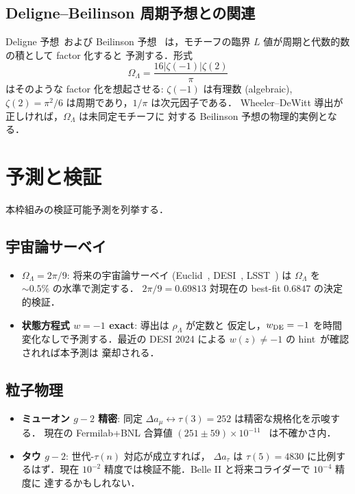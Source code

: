 \documentclass[11pt,a4paper]{article}
\begin{document}
\subsection{Deligne--Beilinson 周期予想との関連}

Deligne 予想~\cite{Deligne1979}および Beilinson 予想~\cite{Beilinson1984}
は，モチーフの臨界 $L$ 値が周期と代数的数の積として factor 化すると
予測する．形式
\begin{equation}
\Omega_\Lambda = \frac{16|\zeta(-1)|\zeta(2)}{\pi}
\end{equation}
はそのような factor 化を想起させる: $\zeta(-1)$ は有理数 (algebraic),
$\zeta(2) = \pi^2/6$ は周期であり，$1/\pi$ は次元因子である．
Wheeler--DeWitt 導出が正しければ，$\Omega_\Lambda$ は未同定モチーフに
対する Beilinson 予想の物理的実例となる．

\section{予測と検証}
\label{sec:predictions}

本枠組みの検証可能予測を列挙する．

\subsection{宇宙論サーベイ}

\begin{itemize}
\item \textbf{$\Omega_\Lambda = 2\pi/9$}: 将来の宇宙論サーベイ
(Euclid~\cite{Euclid}, DESI~\cite{DESI}, LSST~\cite{LSST}) は
$\Omega_\Lambda$ を $\sim 0.5\%$ の水準で測定する．
$2\pi/9 = 0.69813$ 対現在の best-fit $0.6847$ の決定的検証．

\item \textbf{状態方程式 $w = -1$ exact}: 導出は $\rho_\Lambda$ が定数と
仮定し，$w_{\rm DE} = -1$ を時間変化なしで予測する．最近の DESI 2024
による $w(z) \neq -1$ の hint~\cite{DESI2024}が確認されれば本予測は
棄却される．
\end{itemize}

\subsection{粒子物理}

\begin{itemize}
\item \textbf{ミューオン $g-2$ 精密}: 同定
$\Delta a_\mu \leftrightarrow \tau(3) = 252$ は精密な規格化を示唆する．
現在の Fermilab+BNL 合算値 $(251 \pm 59)\times 10^{-11}$~\cite{MuonG2FNAL}
は不確かさ内．

\item \textbf{タウ $g-2$}: 世代-$\tau(n)$ 対応が成立すれば，
$\Delta a_\tau$ は $\tau(5) = 4830$ に比例するはず．現在 $10^{-2}$
精度では検証不能．Belle II と将来コライダーで $10^{-4}$ 精度に
達するかもしれない．
\end{itemize}
\end{document}

